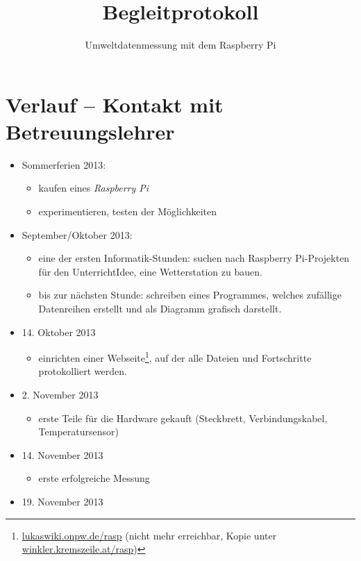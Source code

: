 \documentclass[12pt,a4paper,oneside]{scrartcl}
\author{\myauthor}
\title{Begleitprotokoll}
\subtitle{Umweltdatenmessung mit dem Raspberry Pi}
\begin{document}
\maketitle

\section{Verlauf -- Kontakt mit Betreuungslehrer}
\begin{multicols}{2}
\begin{itemize}

	\item Sommerferien 2013:
	\begin{itemize}
		\item kaufen eines \emph{Raspberry Pi}
		\item experimentieren, testen der Möglichkeiten
	\end{itemize}
	\item September/Oktober 2013:
	\begin{itemize}
		\item eine der ersten Informatik-Stunden: suchen nach Raspberry Pi-Projekten für den Unterricht\newline Idee, eine Wetterstation zu bauen.
		\item bis zur nächsten Stunde: schreiben eines Programmes, welches zufällige Datenreihen erstellt und als Diagramm grafisch darstellt.
	\end{itemize}
	\item 14. Oktober 2013
	\begin{itemize}
		\item einrichten einer Webseite\footnote{\href{http://lukaswiki.onpw.de/rasp/}{lukaswiki.onpw.de/rasp} (nicht mehr erreichbar, Kopie unter \href{http://winkler.kremszeile.at/rasp/}{winkler.kremszeile.at/rasp})}, auf der alle Dateien und Fortschritte protokolliert werden.
	\end{itemize}
	\item 2. November 2013
	\begin{itemize}
		\item erste Teile für die Hardware gekauft (Steckbrett, Verbindungskabel, Temperatursensor)
	\end{itemize}
	\item 14. November 2013
	\begin{itemize}
		\item erste erfolgreiche Messung
	\end{itemize}
	\item 19. November 2013

\end{itemize}
\end{multicols}
\end{document}
